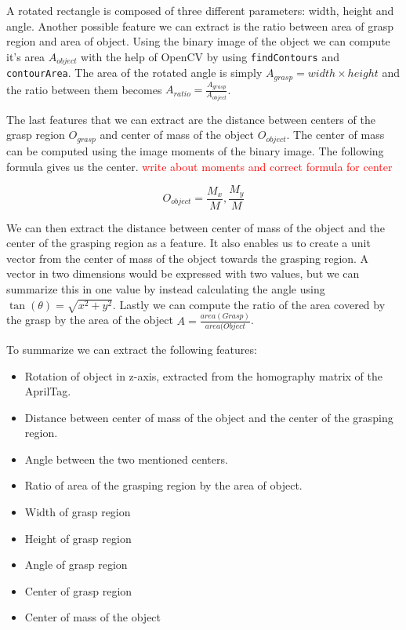 A rotated rectangle is composed of three different parameters: width, height and angle. Another possible feature we can extract is the ratio between area of grasp region and area of object. Using the binary image of the object we can compute it's area \(A_{object}\) with the help of OpenCV by using \texttt{findContours} and \texttt{contourArea}. The area of the rotated angle is simply \(A_{grasp} = width \times height\) and the ratio between them becomes \(A_{ratio} = \frac{A_{grasp}}{A_{object}} \).

The last features that we can extract are the distance between centers of the grasp region \(O_{grasp}\) and center of mass of the object \(O_{object}\). The center of mass can be computed using the image moments of the binary image. The following formula gives us the center. \textcolor{red}{write about moments and correct formula for center}

\[
	O_{object} = \frac{M_x}{M}, \frac{M_y}{M}
\]

We can then extract the distance between center of mass of the object and the center of the grasping region as a feature. It also enables us to create a unit vector from the center of mass of the object towards the grasping region. A vector in two dimensions would be expressed with two values, but we can summarize this in one value by instead calculating the angle using \(\tan(\theta) = \sqrt{x^2 + y^2}\). Lastly we can compute the ratio of the area covered by the grasp by the area of the object \(A = \frac{area(Grasp)}{area(Object}\).

To summarize we can extract the following features:
\begin{itemize}
	\item Rotation of object in z-axis, extracted from the homography matrix of the AprilTag.
	\item Distance between center of mass of the object and the center of the grasping region.
	\item Angle between the two mentioned centers.
	\item Ratio of area of the grasping region by the area of object.
	\item Width of grasp region
	\item Height of grasp region
	\item Angle of grasp region
	\item Center of grasp region
	\item Center of mass of the object
\end{itemize}


